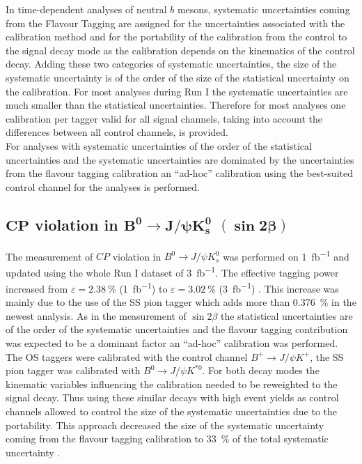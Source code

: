 \documentclass{PoS}
\begin{document}
In time-dependent analyses of neutral $b$ mesons, systematic uncertainties coming from the Flavour Tagging are assigned for the uncertainties associated with the calibration method and for the portability of the calibration from the control to the signal decay mode as the calibration depends on the kinematics of the control decay. Adding these two categories of systematic uncertainties, the size of the systematic uncertainty is of the order of the size of the statistical uncertainty on the calibration.
For most analyses  during Run I the systematic uncertainties are much smaller than the statistical uncertainties. Therefore for most analyses one calibration per tagger valid for all signal channels, taking into account the differences between all control channels, is provided.\\
For analyses with systematic uncertainties of the order of the statistical uncertainties and the systematic uncertainties are dominated by the uncertainties from the flavour tagging calibration an \enquote{ad-hoc} calibration using the best-suited control channel for the analyses is performed.

\subsection{$\bm{C\!P}$ violation in $\bm{B^0}\bm{\to} \bm{J\!/\!\psi K_s^0}$ $\pmb{(\sin 2\beta)}$}

The measurement of $C\!P$ violation in $B^0\to J\!/\!\psi K_s^0$ was performed on \SI{1}{fb^{-1}} and updated using the whole Run I dataset of \SI{3}{fb^{-1}}. The effective tagging power increased from $\varepsilon=\SI{2.38}{\%}$ (\SI{1}{fb^{-1}}) \cite{9} to $\varepsilon=\SI{3.02}{\%}$ (\SI{3}{fb^{-1}}) \cite{10}. This increase was mainly due to the use of the SS pion tagger which adds more than \SI{0.376}{\%} in the newest analysis. As in the measurement of $\sin 2\beta$ the statistical uncertainties are of the order of the systematic uncertainties and the flavour tagging contribution was expected to be a dominant factor an \enquote{ad-hoc} calibration was performed. The OS taggers were calibrated with the control channel $B^+\to J\!/\!\psi K^+$, the SS pion tagger was calibrated with $B^0\to J\!/\!\psi K^{*0}$. 
For both decay modes the kinematic variables influencing the calibration needed to be reweighted to the signal decay. Thus using these similar decays with high event yields as control channels allowed to control the size of the systematic uncertainties due to the portability. This approach decreased the size of the systematic uncertainty coming from the flavour tagging calibration to \SI{33}{\%} of the total systematic uncertainty \cite{10}.
\end{document}
